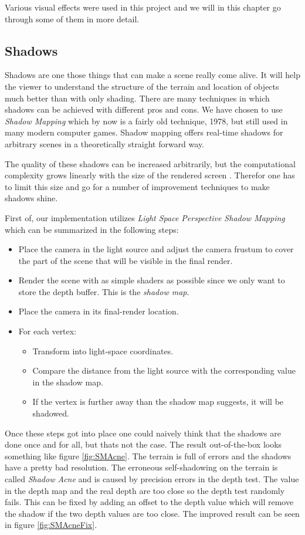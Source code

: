 Various visual effects were used in this project and we will in this chapter go through some of them in more detail. 

\subsection{Shadows}
Shadows are one those things that can make a scene really come alive. It will help the viewer to understand the structure of the terrain and location of objects much better than with only shading. There are many techniques in which shadows can be achieved with different pros and cons. We have chosen to use \textit{Shadow Mapping} \cite{ShadowMapping} which by now is a fairly old technique, 1978, but still used in many modern computer games. Shadow mapping offers real-time shadows for arbitrary scenes in a theoretically straight forward way. 

The quality of these shadows can be increased arbitrarily, but the computational complexity grows linearly with the size of the rendered screen \cite{ShadowMapping}. Therefor one has to limit this size and go for a number of improvement techniques to make shadows shine.

First of, our implementation utilizes \textit{Light Space Perspective Shadow Mapping} \cite{LSPShadowMapping} which can be summarized in the following steps:

\begin{itemize}
\item Place the camera in the light source and adjust the camera frustum to cover the part of the scene that will be visible in the final render.
\item Render the scene with as simple shaders as possible since we only want to store the depth buffer. This is the \textit{shadow map}.
\item Place the camera in its final-render location.
\item For each vertex:
\begin{itemize}
\item Transform into light-space coordinates.
\item Compare the distance from the light source with the corresponding value in the shadow map.
\item If the vertex is further away than the shadow map suggests, it will be shadowed. 
\end{itemize}
\end{itemize}

Once these steps got into place one could naively think that the shadows are done once and for all, but thats not the case. The result out-of-the-box looks something like figure \ref{fig:SMAcne}. The terrain is full of errors and the shadows have a pretty bad resolution. The erroneous self-shadowing on the terrain is called \textit{Shadow Acne} \cite{ImprovedShadowMapping} and is caused by precision errors in the depth test. The value in the depth map and the real depth are too close so the depth test randomly fails. This can be fixed by adding an offset to the depth value which will remove the shadow if the two depth values are too close. The improved result can be seen in figure \ref{fig:SMAcneFix}.

